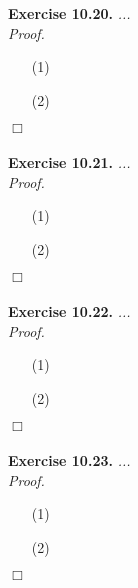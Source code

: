 \documentclass{article}
\begin{document}



\textbf{Exercise 10.20.}
\emph{...} \\

\emph{Proof.}
\begin{enumerate}
\item[(1)]
\item[(2)]

\end{enumerate}
$\Box$ \\\\






\textbf{Exercise 10.21.}
\emph{...} \\

\emph{Proof.}
\begin{enumerate}
\item[(1)]
\item[(2)]

\end{enumerate}
$\Box$ \\\\






\textbf{Exercise 10.22.}
\emph{...} \\

\emph{Proof.}
\begin{enumerate}
\item[(1)]
\item[(2)]

\end{enumerate}
$\Box$ \\\\






\textbf{Exercise 10.23.}
\emph{...} \\

\emph{Proof.}
\begin{enumerate}
\item[(1)]
\item[(2)]

\end{enumerate}
$\Box$ \\\\
\end{document}
